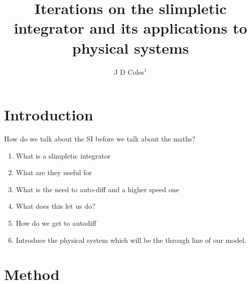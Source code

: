 \documentclass[10pt]{iopart}
\begin{document}
	\title{Iterations on the slimpletic integrator and its applications to physical systems}
	\author{J D Coles$^1$}
	\address{$^1$ Department of Physics, University of Bath, Claverton Down, Bath BA2 7AY, UK}
\begin{abstract}
\lipsum[1]
\end{abstract}
\maketitle
\ioptwocol

\section{Introduction}

How do we talk about the SI before we talk about the maths?
\begin{enumerate}
	\item What is a slimpletic integrator
	\item What are they useful for
	\item What is the need to auto-diff and a higher speed one
	\item What \PHYSICS does this let us do?
	\item How do we get to autodiff
	\item Introduce the physical system which will be the through line of our model.
\end{enumerate}



\section{Method}
\end{document}
